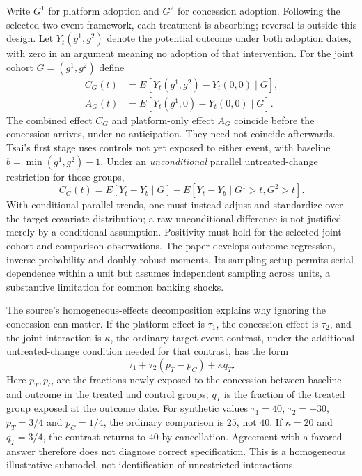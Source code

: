 Write $G^1$ for platform adoption and $G^2$ for concession adoption. Following the selected two-event framework, each
treatment is absorbing; reversal is outside this design. Let $Y_t(g^1,g^2)$ denote the potential outcome under both adoption
dates, with zero in an argument meaning no adoption of that intervention. For the joint cohort $G=(g^1,g^2)$ define
\begin{align*}
 C_G(t)&=E[Y_t(g^1,g^2)-Y_t(0,0)\mid G],\\
 A_G(t)&=E[Y_t(g^1,0)-Y_t(0,0)\mid G].
\end{align*}
The combined effect $C_G$ and platform-only effect $A_G$ coincide before the concession arrives, under no anticipation.
They need not coincide afterwards. Tsai's first stage uses controls not yet exposed to either event, with baseline
$b=\min(g^1,g^2)-1$. Under an \emph{unconditional} parallel untreated-change restriction for those groups,
\[
 C_G(t)=E[Y_t-Y_b\mid G]-E[Y_t-Y_b\mid G^1>t,G^2>t].
\]
With conditional parallel trends, one must instead adjust and standardize over the target covariate distribution; a raw
unconditional difference is not justified merely by a conditional assumption. Positivity must hold for the selected joint
cohort and comparison observations. The paper develops outcome-regression, inverse-probability and doubly robust moments.
Its sampling setup permits serial dependence within a unit but assumes independent sampling across units, a substantive
limitation for common banking shocks.\citep{exec28_panel_tsai}

The source's homogeneous-effects decomposition explains why ignoring the concession can matter. If the platform effect is
$\tau_1$, the concession effect is $\tau_2$, and the joint interaction is $\kappa$, the ordinary target-event contrast,
under the additional untreated-change condition needed for that contrast, has the form
\[
 \tau_1+\tau_2(p_T-p_C)+\kappa q_T.
\]
Here $p_T,p_C$ are the fractions newly exposed to the concession between baseline and outcome in the treated and control
groups; $q_T$ is the fraction of the treated group exposed at the outcome date. For synthetic values $\tau_1=40$,
$\tau_2=-30$, $p_T=3/4$ and $p_C=1/4$, the ordinary comparison is $25$, not $40$. If $\kappa=20$ and $q_T=3/4$,
the contrast returns to $40$ by cancellation. Agreement with a favored answer therefore does not diagnose correct
specification. This is a homogeneous illustrative submodel, not identification of unrestricted interactions.
\citep{exec28_panel_tsai,exec28_panel_reference}

